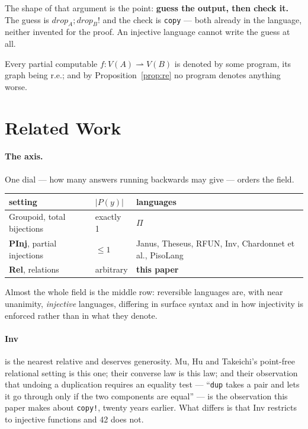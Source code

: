 \documentclass[runningheads,envcountsame]{llncs}
\newcommand{\Rel}{\textbf{Rel}}
\newcommand{\PInj}{\textbf{PInj}}
\begin{document}
The shape of that argument is the point: \textbf{guess the output, then check it.}
The guess is $\mathit{drop}_A \mathbin{;} \mathit{drop}_B!$ and the check is
\texttt{copy} --- both already in the language, neither invented for the proof. An
injective language cannot write the guess at all.

\begin{corollary}
Every partial computable $f : V(A) \rightharpoonup V(B)$ is denoted by some program,
its graph being r.e.; and by Proposition~\ref{prop:re} no program denotes anything
worse.
\end{corollary}

\section{Related Work}\label{sec:related}

\paragraph{The axis.} One dial --- how many answers running backwards may give ---
orders the field.

\begin{center}\small
\begin{tabular}{@{}llp{5.8cm}@{}}
\hline
setting & $|P(y)|$ & languages \\
\hline
Groupoid, total bijections & exactly 1 & $\Pi$ \\
\PInj{}, partial injections & $\le 1$ & Janus, Theseus, RFUN, Inv,
                                        Chardonnet et al., PisoLang \\
\Rel{}, relations & arbitrary & \textbf{this paper} \\
\hline
\end{tabular}
\end{center}

Almost the whole field is the middle row: reversible languages are, with near
unanimity, \emph{injective} languages, differing in surface syntax and in how
injectivity is enforced rather than in what they denote.

\paragraph{Inv} is the nearest relative and deserves generosity. Mu, Hu and
Takeichi's point-free relational setting is this one; their converse law is this
law; and their observation that undoing a duplication requires an equality test ---
``\texttt{dup} takes a pair and lets it go through only if the two components are
equal'' --- is the observation this paper makes about \texttt{copy!}, twenty years
earlier. What differs is that Inv restricts to injective functions and 42 does not.
\end{document}
